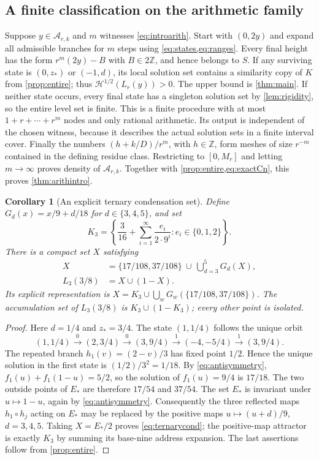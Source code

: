 \documentclass[11pt]{article}
\newtheorem{corollary}[theorem]{Corollary}
\theoremstyle{definition}
\theoremstyle{remark}
\newcommand{\Z}{\mathbb Z}
\newcommand{\HH}{\mathcal H}
\begin{document}
\subsection{A finite classification on the arithmetic family}
Suppose $y\in\mathcal A_{r,k}$ and $m$ witnesses \cref{eq:introarith}.
Start with $(0,2y)$ and expand all admissible branches for $m$ steps using
\cref{eq:states,eq:ranges}. Every final height has the form
$r^m(2y)-B$ with $B\in2\Z$, and hence belongs to $S$.
If any surviving state is $(0,z_*)$ or $(-1,d)$, its local solution set
contains a similarity copy of $K$ from \cref{prop:entire}; thus
$\HH^{1/2}(L_r(y))>0$. The upper bound is \cref{thm:main}.
If neither state occurs, every final state has a singleton solution set
by \cref{lem:rigidity}, so the entire level set is finite.
This is a finite procedure with at most $1+r+\cdots+r^m$ nodes and only
rational arithmetic. Its output is independent of the chosen witness,
because it describes the actual solution sets in a finite interval cover.
Finally the numbers $(h+k/D)/r^m$, with $h\in\Z$, form meshes of size
$r^{-m}$ contained in the defining residue class. Restricting to
$[0,M_r]$ and letting $m\to\infty$ proves density of $\mathcal A_{r,k}$.
Together with \cref{prop:entire,eq:exactCn}, this proves
\cref{thm:arithintro}.

\begin{corollary}[An explicit ternary condensation set]\label{cor:ternarycondensation}
Define $G_d(x)=x/9+d/18$ for $d\in\{3,4,5\}$, and set
\[
 K_3=\left\{\frac3{16}+\sum_{i=1}^{\infty}
       \frac{e_i}{2\cdot9^i}:e_i\in\{0,1,2\}\right\}.
\]
There is a compact set $X$ satisfying
\begin{align}
 X&=\{17/108,37/108\}\ \cup\ \bigcup_{d=3}^5G_d(X),\label{eq:ternarycond}\\
 L_3(3/8)&=X\cup(1-X).
\end{align}
Its explicit representation is $X=K_3\cup\bigcup_wG_w(\{17/108,37/108\})$.
The accumulation set of $L_3(3/8)$ is $K_3\cup(1-K_3)$; every other point
is isolated.
\end{corollary}
\begin{proof}
Here $d=1/4$ and $z_*=3/4$. The state $(1,1/4)$ follows the unique orbit
\[
 (1,1/4)\xrightarrow{0}(2,3/4)\xrightarrow{0}(3,9/4)
 \xrightarrow{1}(-4,-5/4)\xrightarrow{1}(3,9/4).
\]
The repeated branch $h_1(v)=(2-v)/3$ has fixed point $1/2$. Hence the
unique solution in the first state is $(1/2)/3^2=1/18$.
By \cref{eq:antisymmetry}, $f_1(u)+f_1(1-u)=5/2$, so the solution of
$f_1(u)=9/4$ is $17/18$. The two outside points of $E_*$ are therefore
$17/54$ and $37/54$.
The set $E_*$ is invariant under $u\mapsto1-u$, again by
\cref{eq:antisymmetry}. Consequently the three reflected maps
$h_1\circ h_j$ acting on $E_*$ may be replaced by the positive maps
$u\mapsto(u+d)/9$, $d=3,4,5$.
Taking $X=E_*/2$ proves \cref{eq:ternarycond}; the positive-map attractor
is exactly $K_3$ by summing its base-nine address expansion.
The last assertions follow from \cref{prop:entire}.
\end{proof}
\end{document}
